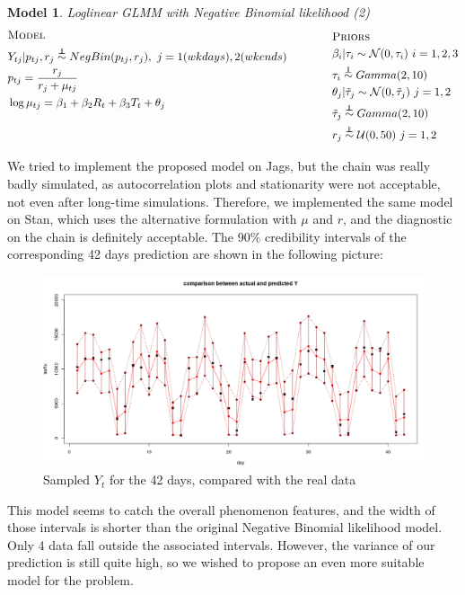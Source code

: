 \documentclass[11pt,twoside]{report}
\newcommand\independent{\protect\mathpalette{\protect\independenT}{\perp}}
\def\independenT#1#2{\mathrel{\rlap{$#1#2$}\mkern2mu{#1#2}}}
\newtheorem{model}{Model}
\begin{document}
\begin{model} Loglinear GLMM with Negative Binomial likelihood (2)\\
	\begin{equation*}
	\begin{aligned}
	&\textsc{Model}\\
	&Y_{tj}  |  p_{tj},r_j \overset{\independent}{\sim} NegBin(p_{tj},r_j), \ j = 1 (wkdays), 2 (wkends)\\
	&p_{tj} = \frac{r_j}{r_j+\mu_{tj}}\\
	&\log{\mu_{tj}} = \beta_1 + \beta_2R_{t} + \beta_3T_{t} + \theta_j\\
	&\\
	&\\
	\end{aligned}
	\qquad \qquad
	\begin{aligned}[c]
	&\textsc{Priors}\\
	&\beta_i | \tau_i \sim \mathcal{N}(0, \tau_i) \ i = 1,2,3\\
	&\tau_i \overset{\independent}{\sim} Gamma(2,10) \\
	&\theta_j | \tilde{\tau}_j \sim \mathcal{N}(0, \tilde{\tau}_j) \ j = 1,2\\
	&\tilde{\tau}_j \overset{\independent}{\sim} Gamma(2,10)\\
	&r_j \overset{\independent}{\sim}\mathcal{U}(0,50) \ j = 1,2
	\end{aligned}
\end{equation*}
	\end{model}
	We tried to implement the proposed model on Jags, but the chain was really badly simulated, as autocorrelation plots and stationarity were not acceptable, not even after long-time simulations. Therefore, we implemented the same model on Stan, which uses the alternative formulation with $\mu$ and $r$, and the diagnostic on the chain is definitely acceptable. The 90$\%$ credibility intervals of the corresponding 42 days prediction are shown in the following picture:
	\begin{figure}[H]
		\centering
		\includegraphics[width=160 mm]{pictures/negbin_double_r_pred.png}
		\caption{Sampled $Y_t$ for the 42 days, compared with the real data}
		\label{fig:nb_d_pred}
	\end{figure}
	This model seems to catch the overall phenomenon features, and the width of those intervals is shorter than the original Negative Binomial likelihood model. Only 4 data fall outside the associated intervals. However, the variance of our prediction is still quite high, so we wished to propose an even more suitable model for the problem.
\end{document}
